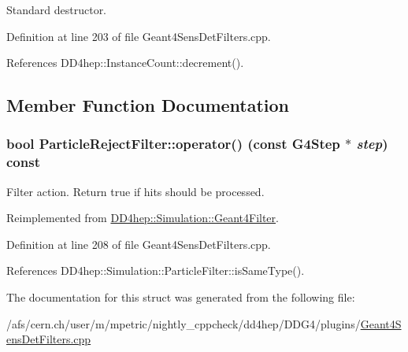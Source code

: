 Standard destructor. 

Definition at line 203 of file Geant4SensDetFilters.cpp.

References DD4hep::InstanceCount::decrement().

\subsection{Member Function Documentation}
\hypertarget{struct_d_d4hep_1_1_simulation_1_1_particle_reject_filter_a4fee0c9944f21ec58360f415427b601f}{
\subsubsection[{operator()}]{\setlength{\rightskip}{0pt plus 5cm}bool ParticleRejectFilter::operator() (const G4Step $\ast$ {\em step}) const}}
\label{struct_d_d4hep_1_1_simulation_1_1_particle_reject_filter_a4fee0c9944f21ec58360f415427b601f}


Filter action. Return true if hits should be processed. 

Reimplemented from \hyperlink{class_d_d4hep_1_1_simulation_1_1_geant4_filter_afff6fafea1b7c0c7d61834ae0a51a23f}{DD4hep::Simulation::Geant4Filter}.

Definition at line 208 of file Geant4SensDetFilters.cpp.

References DD4hep::Simulation::ParticleFilter::isSameType().

The documentation for this struct was generated from the following file:\begin{DoxyCompactItemize}
\item 
/afs/cern.ch/user/m/mpetric/nightly\_\-cppcheck/dd4hep/DDG4/plugins/\hyperlink{_geant4_sens_det_filters_8cpp}{Geant4SensDetFilters.cpp}\end{DoxyCompactItemize}
